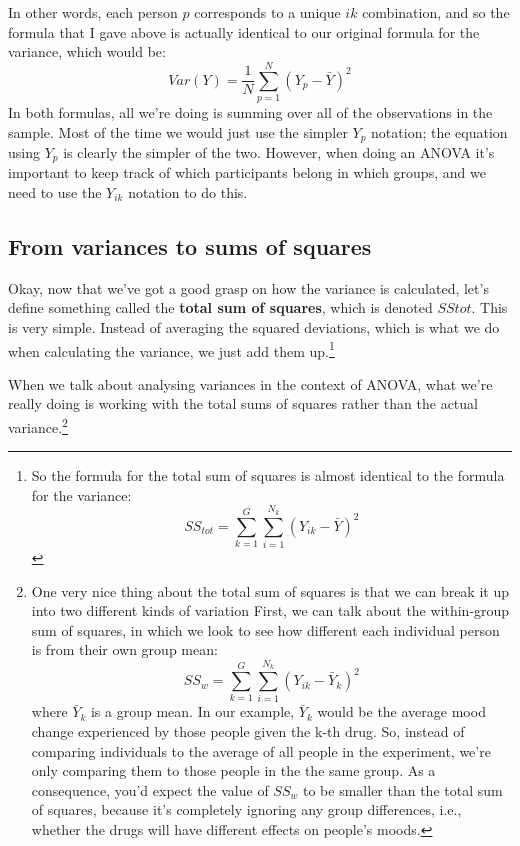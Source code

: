 \documentclass[
  a4paper,
]{book}
\begin{document}
In other words, each person \(p\) corresponds to a unique \(ik\)
combination, and so the formula that I gave above is actually identical
to our original formula for the variance, which would be:
\[Var(Y)=\frac{1}{N}\sum_{p=1}^{N}(Y_p-\bar{Y})^2\] In both formulas,
all we're doing is summing over all of the observations in the sample.
Most of the time we would just use the simpler \(Y_p\) notation; the
equation using \(Y_p\) is clearly the simpler of the two. However, when
doing an ANOVA it's important to keep track of which participants belong
in which groups, and we need to use the \(Y_{ik}\) notation to do this.

\hypertarget{from-variances-to-sums-of-squares}{%
\subsection{From variances to sums of
squares}\label{from-variances-to-sums-of-squares}}

Okay, now that we've got a good grasp on how the variance is calculated,
let's define something called the \textbf{total sum of squares}, which
is denoted \(SStot\). This is very simple. Instead of averaging the
squared deviations, which is what we do when calculating the variance,
we just add them up.\footnote{So the formula for the total sum of
  squares is almost identical to the formula for the variance:
  \[SS_{tot}=\sum_{k=1}^{G} \sum_{i=1}^{N_k} (Y_{ik} - \bar{Y})^2\]}

When we talk about analysing variances in the context of ANOVA, what
we're really doing is working with the total sums of squares rather than
the actual variance.\footnote{One very nice thing about the total sum of
  squares is that we can break it up into two different kinds of
  variation First, we can talk about the within-group sum of squares, in
  which we look to see how different each individual person is from
  their own group mean:
  \[SS_{w}= \sum_{k=1}^{G} \sum_{i=1}^{N_k} (Y_{ik} - \bar{Y}_k)^2\]
  where \(\bar{Y}_k\) is a group mean. In our example, \(\bar{Y}_k\)
  would be the average mood change experienced by those people given the
  k-th drug. So, instead of comparing individuals to the average of all
  people in the experiment, we're only comparing them to those people in
  the the same group. As a consequence, you'd expect the value of
  \(SS_w\) to be smaller than the total sum of squares, because it's
  completely ignoring any group differences, i.e., whether the drugs
  will have different effects on people's moods.}
\end{document}
